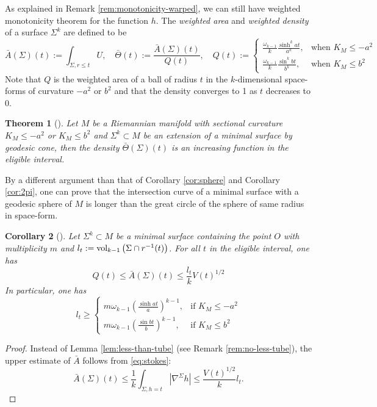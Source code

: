 \documentclass[11pt]{article}
\newtheorem{theorem}{Theorem}
\newtheorem{corollary}[theorem]{Corollary}
\newcommand{\vol}{\mathop{\rm vol}\nolimits}
\begin{document}
As explained in Remark \ref{rem:monotonicity-warped}, we can still have weighted
monotonicity theorem for the function \(h\). 
The \emph{weighted area} and \emph{weighted density} of a surface \(\Sigma^k\) are defined to be
\[
\bar A(\Sigma)(t):= \int_{\Sigma, r\leq t}U,\quad \bar\Theta(t):= \frac{\bar
A(\Sigma)(t)}{Q(t)}, \quad 
Q(t):= \begin{cases}
\frac{\omega_{k-1}}{k}\frac{\sinh^k at}{a^k}       ,  & \text{when } K_M\leq -a^2 \\
\frac{\omega_{k-1}}{k}\frac{\sin^k bt}{b^k}       , & \text{when } K_M\leq b^2
       \end{cases}
\]
Note that \(Q\) is the weighted area of a ball of radius \(t\) in the \(k\)-dimensional
space-forms of curvature \(-a^2\) or \(b^2\) and that the
density converges to 1 as \(t\) decreases to 0.


\begin{theorem}[]
\label{thm:monotonicity-geodesic}
Let \(M\) be a Riemannian manifold with sectional curvature \(K_M\leq -a^2\) or \(K_M\leq b^2\) 
and \(\Sigma^k\subset M\) be an extension of a minimal surface by geodesic cone, then
the density \(\bar\Theta(\Sigma)(t)\) is an increasing function in the eligible interval.
\end{theorem}

By a different argument than that of Corollary \ref{cor:sphere} and
Corollary \ref{cor:2pi}, one can prove that
the intersection curve of a minimal surface with a geodesic sphere of \(M\) is longer than the
great circle of the sphere of same radius in space-form.
\begin{corollary}[]
Let \(\Sigma^k\subset M\) be a minimal surface containing the point \(O\) with
multiplicity \(m\) and \(l_t
:= \vol_{k-1}\left(\Sigma\cap r^{-1}(t)\right)\). For all \(t\) in the eligible
interval, one has
\[
Q(t) \leq \bar A(\Sigma)(t)\leq \frac{l_t}{k}V(t)^{1/2}
\]
In particular, one has
\[
 l_t \geq \begin{cases}
 m\omega_{k-1}\left(\frac{\sinh at}{a}\right)^{k-1}	  ,  & \text{if $K_M\leq -a^2$} \\
 m\omega_{k-1}\left(\frac{\sin bt}{b}\right)^{k-1}	  , & \text{if $K_M\leq b^2$}
	  \end{cases}
\]
\end{corollary}
\begin{proof}
Instead of Lemma \ref{lem:less-than-tube} (see Remark \ref{rem:no-less-tube}), the upper estimate of \(\bar A\) follows from
\eqref{eq:stokes}:
\[
\bar A(\Sigma)(t) \leq \frac{1}{k}\int_{\Sigma, h=t}|\nabla^\Sigma h| \leq \frac{V(t)^{1/2}}{k}l_t.
\]
\end{proof}
\end{document}
